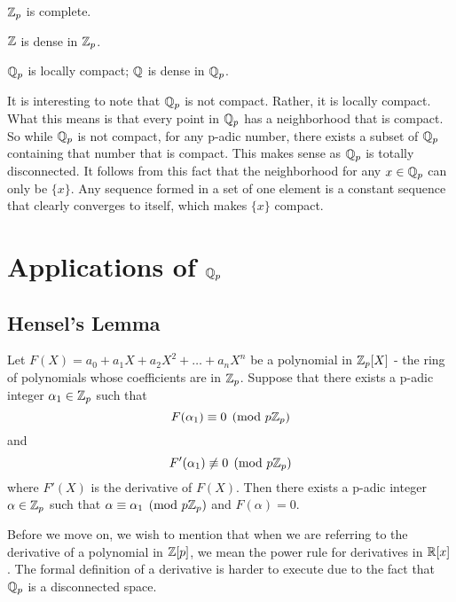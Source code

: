 \documentclass[a4paper]{article}
\begin{document}
\begin{corollary}
$\mathbb Z_p$ is complete.
\end{corollary}

\begin{theorem}
$\mathbb Z$ is dense in $\mathbb Z_p$.
\end{theorem}

\begin{theorem}
$\mathbb Q_p$ is locally compact; $\mathbb Q$ is dense in $\mathbb Q_p$.
\end{theorem}

It is interesting to note that $\mathbb Q_p$ is not compact.  Rather, it is 
locally compact.  What this means is that every point in $\mathbb Q_p$ has a
neighborhood that is compact.  So while $\mathbb Q_p$ is not compact, for any
p-adic number, there exists a subset of $\mathbb Q_p$ containing that number
that is compact.  This makes sense as $\mathbb Q_p$ is totally disconnected. 
It follows from this fact
that the neighborhood for any $x\in\mathbb Q_p$ can only
be $\{x\}$.  Any sequence formed in a set of one element is a constant
sequence that clearly converges to itself, which makes $\{x\}$ compact.

\section{Applications of $\mathbb Q_p$}

\subsection{Hensel's Lemma}

\begin{theorem}
Let $F(X)=a_0+a_1X+a_2X^2+\dots+a_nX^n$ be a polynomial in $\mathbb Z_p[X]$
- the ring of polynomials whose coefficients are in $\mathbb Z_p$.  Suppose
that there exists a p-adic integer $\alpha_1\in\mathbb Z_p$ such that
\[
	F(\alpha_1)\equiv0\pmod {p\mathbb Z_p}
\]
and 
\[
	F'(\alpha_1)\not\equiv0\pmod {p\mathbb Z_p}
\]
where $F'(X)$ is the derivative of $F(X)$.  Then there exists a
p-adic integer $\alpha\in\mathbb Z_p$ such that 
$\alpha\equiv\alpha_1\pmod {p\mathbb Z_p}$ and $F(\alpha)=0$.
\end{theorem}

\begin{remark}
Before we move on, we wish to mention that when we are referring to the
derivative of a polynomial in $\mathbb Z[p]$, we mean the power rule for
derivatives in $\mathbb R[x]$.  The formal definition of a derivative is
harder to execute due to the fact that $\mathbb Q_p$ is a disconnected
space.
\end{remark}
\end{document}
